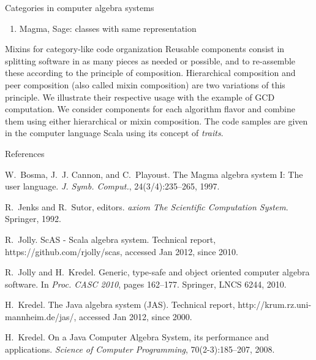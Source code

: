 \documentclass[final]{beamer}
\begin{document}
\begin{frame}[fragile]
\begin{columns}[t]
\begin{column}{.3\linewidth}
\begin{block}{\large Categories in computer algebra systems}
\begin{enumerate}
  \item Magma, Sage: classes with same representation
        \cite{BosmaCannonPlayoust:1997, Stein:2005}
  \end{enumerate}
  \end{block}
  \hfill
  \begin{block}{\large Mixins for category-like code organization}
\scriptsize
Reusable components \cite{Odersky:2005} consist in splitting software in
as many pieces as needed or possible, and to re-assemble these according
to the principle of composition. Hierarchical composition and peer
composition (also called mixin composition) are two variations of this
principle. We illustrate their respective usage with the example of GCD
computation. We consider components for each algorithm flavor and combine
them using either hierarchical or mixin composition. The code samples are
given in the computer language Scala using its concept of
{\em traits}.
  \end{block}
\hfill
  \begin{block}{\large References}
  \tiny %
\begin{thebibliography}{1}

\def\newblock{}
W.~Bosma, J.~J. Cannon, and C.~Playoust.
\newblock The {Magma} algebra system {I}: The user language.
\newblock {\em J. Symb. Comput.}, 24(3/4):235--265, 1997.

\def\newblock{}
R.~Jenks and R.~Sutor, editors.
\newblock {\em {axiom} The Scientific Computation System}.
\newblock Springer, 1992.

\def\newblock{}
R.~Jolly.
\newblock {ScAS} - {Scala} algebra system.
\newblock Technical report, \\ https://github.com/rjolly/scas, accessed Jan
  2012, since 2010.

\def\newblock{}
R.~Jolly and H.~Kredel.
\newblock Generic, type-safe and object oriented computer algebra software.
\newblock In {\em Proc. CASC 2010}, pages 162--177. Springer, LNCS 6244, 2010.

\def\newblock{}
H.~Kredel.
\newblock The {Java} algebra system ({JAS}).
\newblock Technical report, http://krum.\-rz.uni-mann\-he\-im.de/jas/, accessed Jan
  2012, since 2000.

\def\newblock{}
H.~Kredel.
\newblock On a {Java} {Computer} {Algebra} {System}, its performance and
  applications.
\newblock {\em Science of Computer Programming}, 70(2-3):185--207, 2008.


\end{thebibliography}
\end{block}
\end{column}
\end{columns}
\end{frame}
\end{document}
